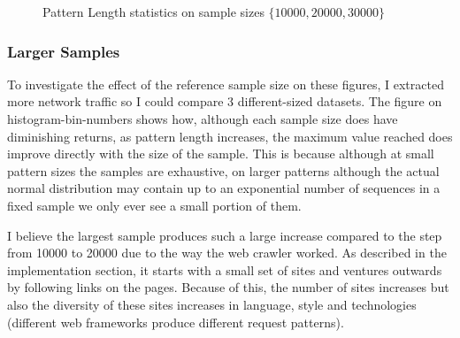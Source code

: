 \documentclass[ %
                    author={Samuel Russell},
                supervisor={Prof. Bogdan Warinschi},
                    degree={MEng},
                     title={Innocuous Ciphertexts},
                  subtitle={The DE-CENSOR Scheme},
                      type={research},
                      year={2018} ]{dissertation}
\begin{document}
\begin{figure}[h]
\begin{subfigure}[b]{.49\linewidth}
\end{subfigure}
\caption{Pattern Length statistics on sample sizes $\{10000, 20000, 30000\}$}
\end{figure}


\subsubsection{Larger Samples}

To investigate the effect of the reference sample size on these figures, I extracted more network traffic so I could compare 3 different-sized datasets.
The figure on histogram-bin-numbers shows how, although each sample size does have diminishing returns, as pattern length increases, the maximum value reached does improve directly with the size of the sample. This is because although at small pattern sizes the samples are exhaustive, on larger patterns although the actual normal distribution may contain up to an exponential number of sequences in a fixed sample we only ever see a small portion of them.

I believe the largest sample produces such a large increase compared to the step from 10000 to 20000 due to the way the web crawler worked.
As described in the implementation section, it starts with a small set of sites and ventures outwards by following links on the pages.
Because of this, the number of sites increases but also the diversity of these sites increases in language, style and technologies (different web frameworks produce different request patterns).
\end{document}
